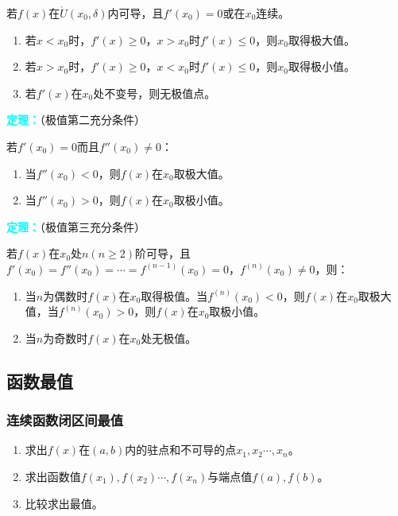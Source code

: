 \documentclass[UTF8, 12pt]{ctexart}
\begin{document}
        若$f(x)$在$\mathring{U}(x_0,\delta)$内可导，且$f'(x_0)=0$或在$x_0$连续。

        \begin{enumerate}
            \item 若$x<x_0$时，$f'(x)\geqslant 0$，$x>x_0$时$f'(x)\leqslant 0$，则$x_0$取得极大值。
            \item 若$x>x_0$时，$f'(x)\geqslant 0$，$x<x_0$时$f'(x)\leqslant 0$，则$x_0$取得极小值。
            \item 若$f'(x)$在$x_0$处不变号，则无极值点。
        \end{enumerate}

        \textcolor{aqua}{\textbf{定理：}}（极值第二充分条件）

        若$f'(x_0)=0$而且$f''(x_0)\neq 0$：

        \begin{enumerate}
            \item 当$f''(x_0)<0$，则$f(x)$在$x_0$取极大值。
            \item 当$f''(x_0)>0$，则$f(x)$在$x_0$取极小值。
        \end{enumerate}

        \textcolor{aqua}{\textbf{定理：}}（极值第三充分条件）

        若$f(x)$在$x_0$处$n(n\geqslant2)$阶可导，且$f'(x_0)=f''(x_0)=\cdots=f^{(n-1)}(x_0)=0$，$f^{(n)}(x_0)\neq0$，则：

        \begin{enumerate}
            \item 当$n$为偶数时$f(x)$在$x_0$取得极值。当$f^{(n)}(x_0)<0$，则$f(x)$在$x_0$取极大值，当$f^{(n)}(x_0)>0$，则$f(x)$在$x_0$取极小值。
            \item 当$n$为奇数时$f(x)$在$x_0$处无极值。
        \end{enumerate}

        \subsection{函数最值}

        \subsubsection{连续函数闭区间最值}

        \begin{enumerate}
            \item 求出$f(x)$在$(a,b)$内的驻点和不可导的点$x_1,x_2\cdots,x_n$。
            \item 求出函数值$f(x_1),f(x_2)\cdots,f(x_n)$与端点值$f(a),f(b)$。
            \item 比较求出最值。
        \end{enumerate}
\end{document}
